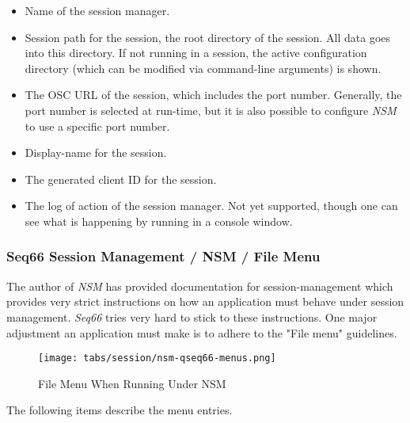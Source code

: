    \begin{itemize}
      \item Name of the session manager.
      \item Session path for the session, the root directory of the session.
         All data goes into this directory. If not running in a session,
         the active configuration directory (which can be modified via
         command-line arguments) is shown.
      \item The OSC URL of the session, which includes the port number.
         Generally, the port number is selected at run-time, but it is also
         possible to configure \textsl{NSM} to use a specific port number.
      \item Display-name for the session.
      \item The generated client ID for the session.
      \item The log of action of the session manager. Not yet supported,
         though one can see what is happening by running in a console window.
   \end{itemize}

\subsubsection{Seq66 Session Management / NSM / File Menu}
\label{subsubsec:sessions_file_menu}

   The author of \textsl{NSM} has provided documentation for session-management
   which provides very strict instructions on how an application must behave
   under session management.  \textsl{Seq66} tries very hard to stick to these
   instructions.  One major adjustment an application must make is to adhere to
   the "File menu" guidelines.

\begin{figure}[H]
   \centering 
   \texttt{[image: tabs/session/nsm-qseq66-menus.png]}
   \caption*{File Menu When Running Under NSM}
\end{figure}

   The following items describe the menu entries.

